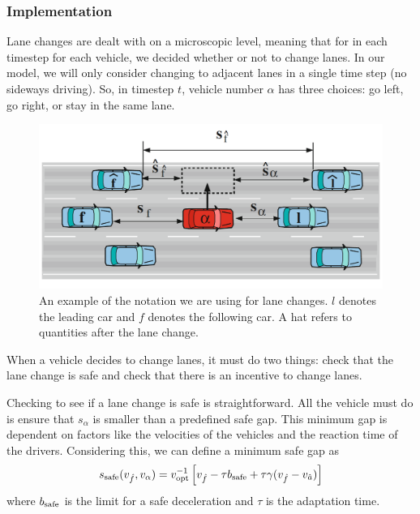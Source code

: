 \documentclass[12pt]{article}
\begin{document}
    \subsubsection{Implementation}

   Lane changes are dealt with on a microscopic level, meaning that for in each timestep for each vehicle, we decided whether or not to change lanes.  In our model, we will only consider changing to adjacent lanes in a single time step (no sideways driving). So, in timestep $t$, vehicle number $\alpha$ has three choices: go left, go right, or stay in the same lane.

      \begin{figure}[H]
        \begin{center}
          \includegraphics{lane_change_diagram.PNG}
        \end{center}
        \caption{An example of the notation we are using for lane changes. $l$ denotes the leading car and $f$ denotes the following car. A hat refers to quantities after the lane change.}
      \end{figure}
   
      When a vehicle decides to change lanes, it must do two things: check that the lane change is safe and check that there is an incentive to change lanes.

      Checking to see if a lane change is safe is straightforward. All the vehicle must do is ensure that $s_{\alpha}$ is smaller than a predefined safe gap. This minimum gap is dependent on factors like the velocities of the vehicles and the reaction time of the drivers. 
      Considering this, we can define a minimum safe gap as 
      \begin{equation}
        s_{\rm safe} (v_{\hat f}, v_{\alpha}) = v_{\rm opt}^{-1} \left[v_{\hat f} -\tau b_{\rm safe} + \tau \gamma (v_{\hat f} - v_{\hat a}) \right]
      \end{equation}
      where $b_{\rm safe}$ is the limit for a safe deceleration and $\tau$ is the adaptation time. 
\end{document}
